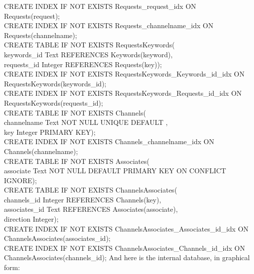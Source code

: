 CREATE INDEX IF NOT EXISTS Requests\_request\_idx ON Requests(request);\\
CREATE INDEX IF NOT EXISTS Requests\_channelname\_idx ON Requests(channelname);\\
CREATE TABLE IF NOT EXISTS RequestsKeywords(\\
\hspace*{\utilLen}keywords\_id Text REFERENCES Keywords(keyword),\\
\hspace*{\utilLen}requests\_id Integer REFERENCES Requests(key));\\
CREATE INDEX IF NOT EXISTS RequestsKeywords\_Keywords\_id\_idx ON\\
\hspace*{\utilLen}RequestsKeywords(keywords\_id);\\
CREATE INDEX IF NOT EXISTS RequestsKeywords\_Requests\_id\_idx ON\\
\hspace*{\utilLen}RequestsKeywords(requests\_id);\\
CREATE TABLE IF NOT EXISTS Channels(\\
\hspace*{\utilLen}channelname Text NOT NULL UNIQUE DEFAULT \fatUnderscore,\\
\hspace*{\utilLen}key Integer PRIMARY KEY);\\
CREATE INDEX IF NOT EXISTS Channels\_channelname\_idx ON Channels(channelname);\\
CREATE TABLE IF NOT EXISTS Associates(\\
\hspace*{\utilLen}associate Text NOT NULL DEFAULT \fatUnderscore{} PRIMARY KEY ON CONFLICT IGNORE);\\
CREATE TABLE IF NOT EXISTS ChannelsAssociates(\\
\hspace*{\utilLen}channels\_id Integer REFERENCES Channels(key),\\
\hspace*{\utilLen}associates\_id Text REFERENCES Associates(associate),\\
\hspace*{\utilLen}direction Integer);\\
CREATE INDEX IF NOT EXISTS ChannelsAssociates\_Associates\_id\_idx ON\\
\hspace*{\utilLen}ChannelsAssociates(associates\_id);\\
CREATE INDEX IF NOT EXISTS ChannelsAssociates\_Channels\_id\_idx ON\\
\hspace*{\utilLen}ChannelsAssociates(channels\_id);
\outputEnd{}
\newpage
And here is the internal database, in graphical form:\\
\appendixEnd{}
